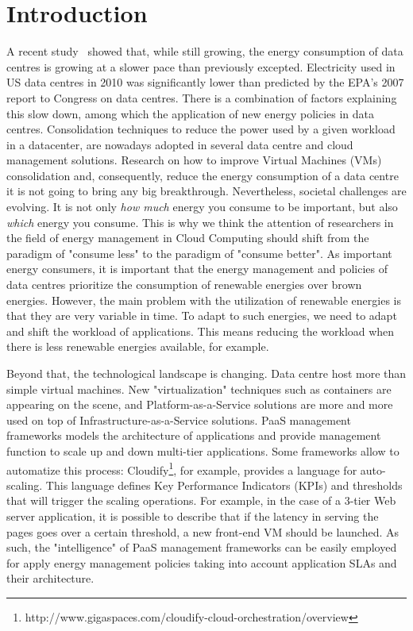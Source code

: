 \section{Introduction}
\label{sec: intro}

A recent study~\cite{koomey2011} showed that, while still growing, the energy consumption of data centres is growing at a slower pace than previously excepted.
Electricity used in US data centres in 2010 was significantly lower than predicted by the EPA’s 2007 report to Congress on data centres.
There is a combination of factors explaining this slow down, among which the application of new energy policies in data centres.
Consolidation techniques to reduce the power used by a given workload in a datacenter, are nowadays adopted in several data centre and cloud management solutions.
Research on how to improve Virtual Machines (VMs) consolidation and, consequently, reduce the energy consumption of a data centre it is not going to bring any big breakthrough.
Nevertheless, societal challenges are evolving.
It is not only \emph{how much} energy you consume to be important, but also \emph{which} energy you consume. 
This is why we think the attention of researchers in the field of energy management in Cloud Computing should shift from the paradigm of "consume less" to the paradigm of "consume better".
As important energy consumers, it is important that the energy management and policies of data centres prioritize the consumption of renewable energies over brown energies.
However, the main problem with the utilization of renewable energies is that they are very variable in time.
To adapt to such energies, we need to adapt and shift the workload of applications.
This means reducing the workload when there is less renewable energies available, for example.

Beyond that, the technological landscape is changing. Data centre host more than simple virtual machines. New "virtualization" techniques such as containers are appearing on the scene, and Platform-as-a-Service solutions are more and more used on top of Infrastructure-as-a-Service solutions. PaaS management frameworks models the architecture of applications and provide management function to scale up and down multi-tier applications. 
Some frameworks allow to automatize this process: Cloudify\footnote{http://www.gigaspaces.com/cloudify-cloud-orchestration/overview}, for example, provides a language for auto-scaling.
This language defines Key Performance Indicators (KPIs) and thresholds that will trigger the scaling operations.
For example, in the case of a 3-tier Web server application, it is possible to describe that if the latency in serving the pages goes over a certain threshold, a new front-end VM should be launched.
As such, the "intelligence" of PaaS management frameworks can be easily employed for apply energy management policies taking into account application SLAs and their architecture.

